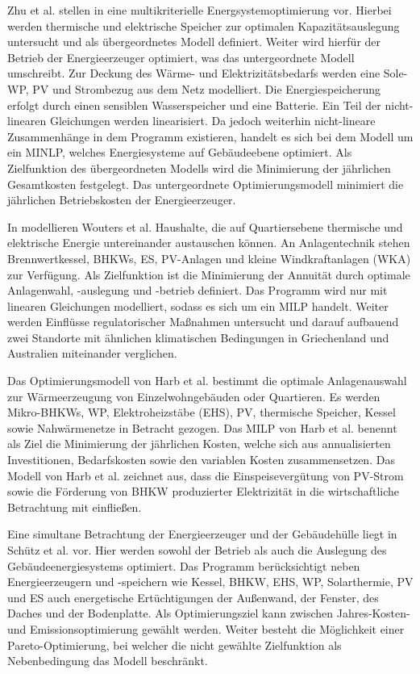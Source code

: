 Zhu et al. stellen in \cite{Zhu.2019} eine multikriterielle Energsystemoptimierung vor.
Hierbei werden thermische und elektrische Speicher zur optimalen Kapazitätsauslegung untersucht und als übergeordnetes Modell definiert.
Weiter wird hierfür der Betrieb der Energieerzeuger optimiert, was das untergeordnete Modell umschreibt.
Zur Deckung des Wärme- und Elektrizitätsbedarfs werden eine Sole-WP, PV und Strombezug aus dem Netz modelliert.
Die Energiespeicherung erfolgt durch einen sensiblen Wasserspeicher und eine Batterie.
Ein Teil der nicht-linearen Gleichungen werden linearisiert. 
Da jedoch weiterhin nicht-lineare Zusammenhänge in dem Programm existieren, handelt es sich bei dem Modell um ein MINLP, welches Energiesysteme auf Gebäudeebene optimiert.
Als Zielfunktion des übergeordneten Modells wird die Minimierung der jährlichen Gesamtkosten festgelegt.
Das untergeordnete Optimierungsmodell minimiert die jährlichen Betriebskosten der Energieerzeuger.

In \cite{Wouters.2014} modellieren Wouters et al. Haushalte, die auf Quartiersebene thermische und elektrische Energie untereinander austauschen können.
An Anlagentechnik stehen Brennwertkessel, BHKWs, ES, PV-Anlagen und kleine Windkraftanlagen (WKA) zur Verfügung.
Als Zielfunktion ist die Minimierung der Annuität durch optimale Anlagenwahl, -auslegung und -betrieb definiert.
Das Programm wird nur mit linearen Gleichungen modelliert, sodass es sich um ein MILP handelt.
Weiter werden Einflüsse regulatorischer Maßnahmen untersucht und darauf aufbauend zwei Standorte mit ähnlichen klimatischen Bedingungen in Griechenland und Australien miteinander verglichen.

Das Optimierungsmodell von Harb et al. \cite{Harb.2016} bestimmt die optimale Anlagenauswahl zur Wärmeerzeugung von Einzelwohngebäuden oder Quartieren.
Es werden Mikro-BHKWs, WP, Elektroheizstäbe (EHS), PV, thermische Speicher, Kessel sowie Nahwärmenetze in Betracht gezogen.
Das MILP von Harb et al. benennt als Ziel die Minimierung der jährlichen Kosten, welche sich aus annualisierten Investitionen, Bedarfskosten sowie den variablen Kosten zusammensetzen.
Das Modell von Harb et al. zeichnet aus, dass die Einspeisevergütung von PV-Strom sowie die Förderung von BHKW produzierter Elektrizität in die wirtschaftliche Betrachtung mit einfließen.

Eine simultane Betrachtung der Energieerzeuger und der Gebäudehülle liegt in Schütz et al. \cite{Schutz.2017} vor.
Hier werden sowohl der Betrieb als auch die Auslegung des Gebäudeenergiesystems optimiert.
Das Programm berücksichtigt neben Energieerzeugern und -speichern wie Kessel, BHKW, EHS, WP, Solarthermie, PV und ES auch energetische Ertüchtigungen der Außenwand, der Fenster, des Daches und der Bodenplatte.
Als Optimierungsziel kann zwischen Jahres-Kosten- und Emissionsoptimierung gewählt werden.
Weiter besteht die Möglichkeit einer Pareto-Optimierung, bei welcher die nicht gewählte Zielfunktion als Nebenbedingung das Modell beschränkt.


